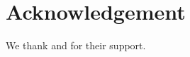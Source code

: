 \section*{Acknowledgement}
We thank \projguidename{} and \schoolname{} for their support.\par
\clearpage
